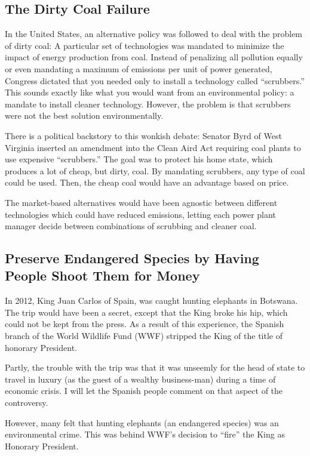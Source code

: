 \subsection{The Dirty Coal Failure}

In the United States, an alternative policy was followed to deal with the
problem of dirty coal: A particular set of technologies was mandated to
minimize the impact of energy production from coal. Instead of penalizing all
pollution equally or even mandating a maximum of emissions per unit of power
generated, Congress dictated that you needed only to install a technology
called ``scrubbers.'' This sounds exactly like what you would want from an
environmental policy: a mandate to install cleaner technology. However, the
problem is that scrubbers were not the best solution environmentally.

There is a political backstory to this wonkish debate: Senator Byrd of West
Virginia inserted an amendment into the Clean Aird Act requiring coal plants to
use expensive ``scrubbers.'' The goal was to protect his home state, which
produces a lot of cheap, but dirty, coal. By mandating scrubbers, any type of
coal could be used. Then, the cheap coal would have an advantage based on
price.

The market-based alternatives would have been agnostic between different
technologies which could have reduced emissions, letting each power plant
manager decide between combinations of scrubbing and cleaner coal.

\subsection{Preserve Endangered Species by Having People Shoot Them for Money}

In 2012, King Juan Carlos of Spain, was caught hunting elephants in Botswana.
The trip would have been a secret, except that the King broke his hip, which
could not be kept from the press. As a result of this experience, the Spanish
branch of the World Wildlife Fund (WWF) stripped the King of the title of
honorary President.

Partly, the trouble with the trip was that it was unseemly for the head of
state to travel in luxury (as the guest of a wealthy business-man) during a
time of economic crisis. I will let the Spanish people comment on that aspect
of the controversy.

However, many felt that hunting elephants (an endangered species) was an
environmental crime. This was behind WWF's decision to ``fire'' the King as
Honorary President.


